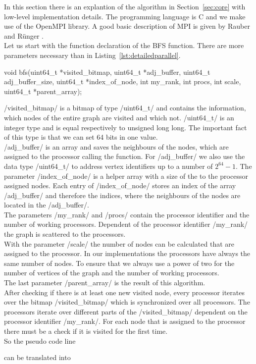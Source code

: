 \documentclass[12pt,a4paper]{article}
\begin{document}
In this section there is an explantion of the algorithm in Section~\ref{sec:core} with low-level implementation details. The programming language is C and we make use of the OpenMPI library. A good basic description of MPI is given by Rauber and R{\"u}nger \cite{rauber}. \\
Let us start with the function declaration of the BFS function. There are more parameters necessary than in Listing~\ref{lst:detailedparallel}.
\begin{ccode}
void bfs(uint64_t *visited_bitmap, uint64_t *adj_buffer, uint64_t adj_buffer_size, uint64_t *index_of_node, int my_rank, int procs, int scale, uint64_t *parent_array);
\end{ccode}
\cinline/visited_bitmap/ is a bitmap of type \cinline/uint64_t/ and contains the information, which nodes of the entire graph are visited and which not. \cinline/uint64_t/ is an integer type and is equal respectively to unsigned long long. The important fact of this type is that we can set 64 bits in one value. \\ 
\cinline/adj_buffer/ is an array and saves the neighbours of the nodes, which are assigned to the processor calling the function. For \cinline/adj_buffer/ we also use the data type \cinline/uint64_t/ to address vertex identifiers up to a number of \(2^{64}-1\). The parameter \cinline/index_of_node/ is a helper array with a size of the to the processor assigned nodes. Each entry of \cinline/index_of_node/ stores an index of the array \cinline/adj_buffer/ and therefore the indices, where the neighbours of the nodes are located in the \cinline/adj_buffer/. \\
The parameters \cinline/my_rank/ and \cinline/procs/ contain the processor identifier and the number of working processors. Dependent of the processor identifier \cinline/my_rank/ the graph is scattered to the processors.\\
With the parameter \cinline/scale/ the number of nodes can be calculated that are assigned to the processor. In our implementations the processors have always the same number of nodes. To ensure that we always use a power of two for the number of vertices of the graph and the number of working processors. \\
The last parameter \cinline/parent_array/ is the result of this algorithm. \\
After checking if there is at least one new visited node, every processor iterates over the bitmap \cinline/visited_bitmap/ which is synchronized over all processors. The processors iterate over different parts of the \cinline/visited_bitmap/ dependent on the processor identifier \cinline/my_rank/. For each node that is assigned to the processor there must be a check if it is visited for the first time.\\
So the pseudo code line
\begin{ccode}
if (nodes_owned[i] is visited for the first time){
\end{ccode}
can be translated into
\begin{ccode}
position = (uint64_t) pow(2, (i %
if (position & visited_bitmap[((nodes_owned_count*my_rank+i) / BITS)] & ~visited_local[(i / BITS)]) {
\end{ccode}
\end{document}
